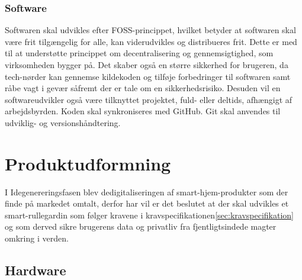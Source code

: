\documentclass[11pt]{article}
\begin{document}
\subsubsection{Software}
Softwaren skal udvikles efter FOSS-princippet, hvilket betyder at softwaren skal være frit tilgængelig for alle, kan viderudvikles og distribueres frit. Dette er med til at understøtte princippet om decentralisering og gennemsigtighed, som virksomheden bygger på. Det skaber også en større sikkerhed for brugeren, da tech-nørder kan gennemse kildekoden og tilføje forbedringer til softwaren samt råbe vagt i gevær såfremt der er tale om en sikkerhedsrisiko. Desuden vil en softwareudvikler også være tilknyttet projektet, fuld- eller deltids, afhængigt af arbejdsbyrden. Koden skal synkroniseres med GitHub. Git skal anvendes til udviklig- og versionshåndtering.


\newpage

\section{Produktudformning}
\label{sec:org563ee9e}
I Idegenereringsfasen blev dedigitaliseringen af smart-hjem-produkter som der finde på markedet omtalt, derfor har vil er det beslutet at der skal udvikles et smart-rullegardin som følger kravene i kravspecifikationen\ref{sec:kravspecifikation} og som derved sikre brugerens data og privatliv fra fjentligtsindede magter omkring i verden.

\subsection{Hardware}
\label{sec:orgdbd4fd8}
\end{document}
